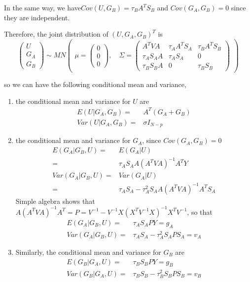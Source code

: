 \documentclass{article}
\begin{document}
    In the same way, we have$Cov(U,G_B)=\tau_BA^TS_B$ and $Cov(G_A,G_B)=0$ since they are independent.

    Therefore, the joint distribution of $(U,G_A,G_B)^T$ is
    \[
        \begin{pmatrix} U\\G_A\\G_B \end{pmatrix} \sim MN \begin{pmatrix} \mu=\begin{pmatrix} 0\\0\\0 \end{pmatrix},\quad \Sigma=\begin{pmatrix} A^TVA&\tau_AA^TS_A&\tau_BA^TS_B\\ \tau_AS_AA&\tau_AS_A&0\\\tau_BS_BA&0&\tau_BS_B \end{pmatrix} \end{pmatrix}
    \]

    so we can have the following conditional mean and variance,
    \begin{enumerate}
        \item the conditional mean and variance for $U$ are
            \[\begin{split}
                E(U|G_A,G_B)=&A^T(G_A+G_B)\\
                Var(U|G_A,G_B) = & \sigma I_{N-p}
            \end{split}\]
        \item the conditional mean and variance for $G_A$, since $Cov(G_A,G_B)=0$
            \[\begin{split}
                E(G_A|G_B,U)=&E(G_A|U)\\
                                           =&\tau_AS_AA(A^TVA)^{-1}A^TY\\
                Var(G_A|G_B,U)=&Var(G_A|U)\\
                                               =&\tau_AS_A-\tau_A^2S_AA(A^TVA)^{-1}A^TS_A
            \end{split}\]
            Simple algebra shows that $A(A^TVA)^{-1}A^T=P=V^{-1}-V^{-1}X(X^TV^{-1}X)^{-1}X^TV^{-1}$, so that
            \[\begin{split}
                E(G_A|G_B,U)=&\tau_AS_APY=g_A\\
                Var(G_A|G_B,U)=&\tau_AS_A-\tau_A^2S_APS_A=v_A
            \end{split}\]
        \item Similarly, the conditional mean and variance for $G_B$ are
             \[\begin{split}
                E(G_B|G_A,U)=&\tau_BS_BPY=g_B\\
                Var(G_B|G_A,U)=&\tau_BS_B-\tau_B^2S_BPS_B=v_B
            \end{split}\]
    \end{enumerate}
\end{document}
